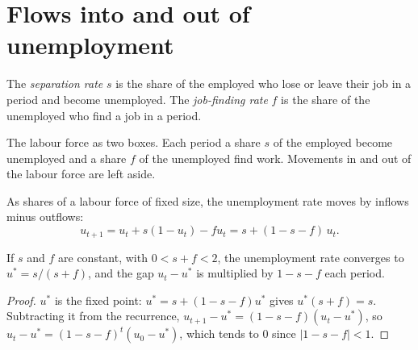 \section{Flows into and out of unemployment}\label{sec:g11:unemployment:flows}

\begin{definition}\label{def:g11:unemployment:separation-rate}
The \emph{separation rate} $s$ is the share of the employed who lose or leave their job in a period and become unemployed. The \emph{job-finding
rate}\label{def:g11:unemployment:job-finding-rate} $f$ is the share of the unemployed who find a job in a period.
\end{definition}

\begin{omfigure}

{\small The labour force as two boxes. Each period a share $s$ of the employed become unemployed and a share $f$ of the unemployed find work. Movements in and out of the
labour force are left aside.}
\end{omfigure}

As shares of a labour force of fixed size, the unemployment rate moves by inflows minus outflows:
\[ u_{t+1} = u_t + s(1 - u_t) - f u_t = s + (1 - s - f)\,u_t. \]

\begin{proposition}\label{prop:g11:unemployment:steady}
If $s$ and $f$ are constant, with $0 < s + f < 2$, the unemployment rate converges to $u^* = s/(s + f)$, and the gap $u_t - u^*$ is multiplied by $1 - s - f$ each period.
\end{proposition}
\begin{proof}
$u^*$ is the fixed point: $u^* = s + (1 - s - f)u^*$ gives $u^*(s + f) = s$. Subtracting it from the recurrence, $u_{t+1} - u^* = (1 - s - f)(u_t - u^*)$, so
$u_t - u^* = (1 - s - f)^t (u_0 - u^*)$, which tends to 0 since $|1 - s - f| < 1$.
\end{proof}

